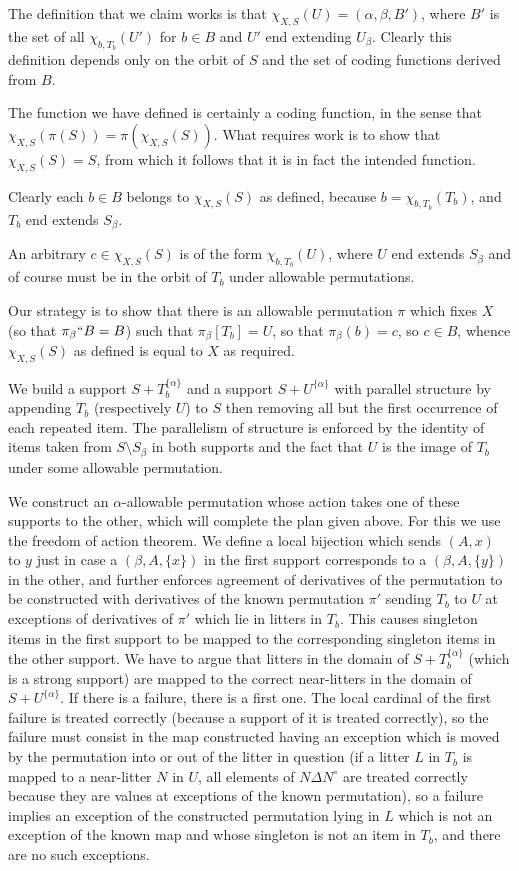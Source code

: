 The definition that we claim works is that $\chi_{X,S}(U) = (\alpha,\beta,B')$, where $B'$ is the set of all $\chi_{b,T_b}(U')$ for $b \in B$ and $U'$ end extending $U_\beta$.  Clearly this definition depends only on the orbit of $S$ and the set of coding functions derived from $B$.

The function we have defined is certainly a coding function, in the sense that $\chi_{X,S}(\pi(S)) = \pi(\chi_{X,S}(S))$.  What requires work is to show that
$\chi_{X,S}(S)=S$, from which it follows that it is in fact the intended function.

Clearly each $b \in B$ belongs to $\chi_{X,S}(S)$ as defined, because $b = \chi_{b,T_b}(T_b)$, and $T_b$ end extends $S_\beta$.

An arbitrary $c \in \chi_{X,S}(S)$ is of the form $\chi_{b,T_b}(U)$, where $U$ end extends $S_\beta$ and of course must be in the orbit of $T_b$ under allowable permutations.

Our strategy is to show that there is an allowable permutation $\pi$ which fixes $X$ (so that $\pi_\beta``B = B$) such that $\pi_\beta[T_b]=U$, so that
$\pi_\beta(b) = c$, so $c \in B$, whence $\chi_{X,S}(S)$ as defined is equal to $X$ as required.

We build a support $S+T_b^{\{\alpha\}}$ and a support $S+U^{\{\alpha\}}$ with parallel structure by appending $T_b$ (respectively $U$) to $S$ then removing all but the first occurrence of each repeated item.  The parallelism of structure is enforced by the identity of items taken from $S \setminus S_\beta$
in both supports and the fact that $U$ is the image of $T_b$ under some allowable permutation.

We construct an $\alpha$-allowable permutation whose action takes one of these supports to the other, which will complete the plan given above.
For this we use the freedom of action theorem.  We define a local bijection which sends $(A,x)$ to $y$ just in case a $(\beta,A,\{x\})$ in the first support corresponds to a $(\beta,A,\{y\})$ in the other, and further enforces agreement of derivatives  of the permutation to be constructed with derivatives of the known permutation $\pi'$ sending $T_b$ to $U$ at exceptions of derivatives of $\pi'$ which lie in litters in $T_b$.  This causes singleton items in the first support to be mapped to the corresponding singleton items in the other support.  We have to argue that litters in the domain of $S+T_b^{\{\alpha\}}$ (which is a strong support) are mapped to the correct near-litters in the domain of $S+U^{\{\alpha\}}$.  If there is a failure, there is a first one.  The local cardinal of the
first failure is treated correctly (because a support of it is treated correctly), so the failure must consist in the map constructed having an exception which is moved by the permutation into or out of the litter in question (if a litter $L$ in $T_b$ is mapped to a near-litter $N$ in $U$, all elements of $N \Delta N^\circ$ are treated correctly because they are values at exceptions of the known permutation), so a failure implies an exception of the constructed permutation lying in $L$ which is not an exception of the known map and whose singleton is not an item in $T_b$, and there are no such exceptions.

